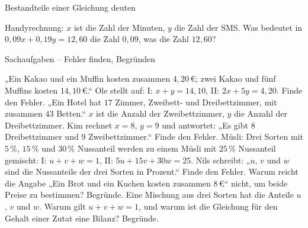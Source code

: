 \begin{aufgabe}{Bestandteile einer Gleichung deuten}
\begin{teile}
\teil Handyrechnung: $x$ ist die Zahl der Minuten, $y$ die Zahl der SMS. Was bedeutet in $0{,}09x + 0{,}19y = 12{,}60$ die Zahl $0{,}09$, was die Zahl $12{,}60$?
\end{teile}
\end{aufgabe}

\begin{aufgabe}{Sachaufgaben – Fehler finden, Begründen}
\begin{teile}
\teil „Ein Kakao und ein Muffin kosten zusammen $4{,}20\,€$; zwei Kakao und fünf Muffins kosten $14{,}10\,€$.“ Ole stellt auf: I: $x + y = 14{,}10$, II: $2x + 5y = 4{,}20$. Finde den Fehler.
\teil „Ein Hotel hat $17$ Zimmer, Zweibett- und Dreibettzimmer, mit zusammen $43$ Betten.“ $x$ ist die Anzahl der Zweibettzimmer, $y$ die Anzahl der Dreibettzimmer. Kim rechnet $x = 8$, $y = 9$ und antwortet: „Es gibt $8$ Dreibettzimmer und $9$ Zweibettzimmer.“ Finde den Fehler.
\teil Müsli: Drei Sorten mit $5\,\%$, $15\,\%$ und $30\,\%$ Nussanteil werden zu einem Müsli mit $25\,\%$ Nussanteil gemischt: I: $u + v + w = 1$, II: $5u + 15v + 30w = 25$. Nils schreibt: „$u$, $v$ und $w$ sind die Nussanteile der drei Sorten in Prozent.“ Finde den Fehler.
\teil Warum reicht die Angabe „Ein Brot und ein Kuchen kosten zusammen $8\,€$“ nicht, um beide Preise zu bestimmen? Begründe.
\teil Eine Mischung aus drei Sorten hat die Anteile $u$, $v$ und $w$. Warum gilt $u + v + w = 1$, und warum ist die Gleichung für den Gehalt einer Zutat eine Bilanz? Begründe.
\end{teile}
\end{aufgabe}
